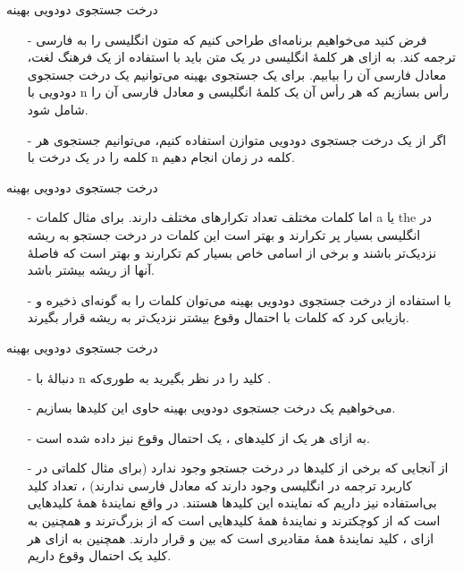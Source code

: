 \begin{frame}{‌درخت جستجوی دودویی بهینه}
\begin{itemize}\itemr
\item[-]
فرض کنید می‌خواهیم برنامه‌ای طراحی کنیم که متون انگلیسی را به فارسی ترجمه کند. به ازای هر کلمهٔ انگلیسی در یک متن باید با استفاده از یک فرهنگ لغت، معادل فارسی آن را بیابیم. برای یک جستجوی بهینه می‌توانیم یک درخت جستجوی دودویی با n رأس بسازیم که هر رأس آن یک کلمهٔ انگلیسی و معادل فارسی آن را شامل شود.
\item[-]
اگر از یک درخت جستجوی دودویی متوازن
استفاده کنیم، می‌توانیم جستجوی هر کلمه را در یک درخت با n کلمه در زمان
انجام دهیم.
\end{itemize}
\end{frame}

\begin{frame}{‌درخت جستجوی دودویی بهینه}
\begin{itemize}\itemr
\item[-]
اما کلمات مختلف تعداد تکرارهای مختلف دارند. برای مثال کلمات a یا the در انگلیسی بسیار پر تکرارند و بهتر است این کلمات در درخت جستجو به ریشه نزدیک‌تر باشند و برخی از اسامی خاص بسیار کم تکرارند و بهتر است که فاصلهٔ آنها از ریشه بیشتر باشد.
\item[-]
با استفاده از درخت جستجوی دودویی بهینه
می‌توان کلمات را به گونه‌ای ذخیره و بازیابی کرد که کلمات با احتمال وقوع بیشتر نزدیک‌تر به ریشه قرار بگیرند.
\end{itemize}
\end{frame}


\begin{frame}{‌درخت جستجوی دودویی بهینه}
\begin{itemize}\itemr
\item[-]
دنبالهٔ
با n کلید را در نظر بگیرید به طوری‌که
 .
\item[-]
می‌خواهیم یک درخت جستجوی دودویی بهینه حاوی این کلیدها بسازیم.
\item[-]
به ازای هر یک از کلیدهای
، یک احتمال وقوع
نیز داده شده است.
\item[-]
از آنجایی که برخی از کلیدها در درخت جستجو وجود ندارد‌ (برای مثال کلماتی در کاربرد ترجمه در انگلیسی وجود دارند که معادل فارسی ندارند) ، تعداد
کلید بی‌استفاده
نیز داریم که نماینده این کلیدها هستند. در واقع
نمایندهٔ همهٔ کلیدهایی است که از
کوچکترند و
نمایندهٔ همهٔ کلیدهایی است که از
بزرگ‌ترند و همچنین به ازای
، کلید
نمایندهٔ همهٔ مقادیری است که بین
و
قرار دارند. همچنین به ازای هر کلید
یک احتمال وقوع
داریم.
\end{itemize}
\end{frame}


